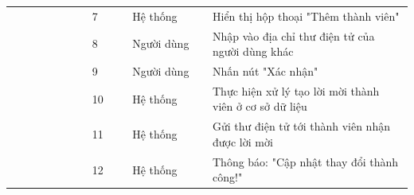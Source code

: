 \documentclass[../DoAn.tex]{subfiles}
\begin{document}
\begin{table}[ht]
\begin{tabular}{| p{0.2\linewidth} | p{0.1\linewidth} | p{0.2\linewidth} | p{0.5\linewidth} |}
                                                                     & \multicolumn{1}{p{0.1\linewidth}|}{7}                                                        & \multicolumn{1}{p{0.2\linewidth}|}{Hệ thống}               & \multicolumn{1}{p{0.5\linewidth}|}{Hiển thị hộp thoại "Thêm thành viên"}                                                              \\ \cline{2-4}
                                                                     & \multicolumn{1}{p{0.1\linewidth}|}{8}                                                        & \multicolumn{1}{p{0.2\linewidth}|}{Người dùng}             & \multicolumn{1}{p{0.5\linewidth}|}{Nhập vào địa chỉ thư điện tử của người dùng khác}                                                  \\ \cline{2-4}
                                                                     & \multicolumn{1}{p{0.1\linewidth}|}{9}                                                        & \multicolumn{1}{p{0.2\linewidth}|}{Người dùng}             & \multicolumn{1}{p{0.5\linewidth}|}{Nhấn nút "Xác nhận"}                                                                               \\ \cline{2-4}
                                                                     & \multicolumn{1}{p{0.1\linewidth}|}{10}                                                       & \multicolumn{1}{p{0.2\linewidth}|}{Hệ thống}               & \multicolumn{1}{p{0.5\linewidth}|}{Thực hiện xử lý tạo lời mời thành viên ở cơ sở dữ liệu}                                            \\ \cline{2-4}
                                                                     & \multicolumn{1}{p{0.1\linewidth}|}{11}                                                       & \multicolumn{1}{p{0.2\linewidth}|}{Hệ thống}               & \multicolumn{1}{p{0.5\linewidth}|}{Gửi thư điện tử tới thành viên nhận được lời mời}                                                  \\ \cline{2-4}
                                                                     & \multicolumn{1}{p{0.1\linewidth}|}{12}                                                       & \multicolumn{1}{p{0.2\linewidth}|}{Hệ thống}               & \multicolumn{1}{p{0.5\linewidth}|}{Thông báo: "Cập nhật thay đổi thành công!"}                                                        \\ \hline


\end{tabular}
\end{table}
\end{document}
